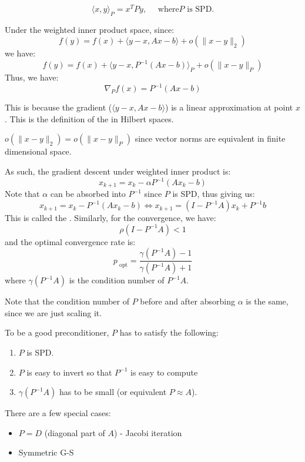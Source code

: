 \documentclass[../main/main.tex]{subfiles}
\begin{document}
\begin{definition}
  \[
    \langle x,y\rangle_{P} = x^{T} P y, \quad  \text{ where} P \text{ is SPD}.
  \]
\end{definition}
Under the weighted inner product space, since: \[
  f(y) = f(x) + \langle y-x, Ax-b \rangle + o(\|x-y\|_{2})
\]
we have: \[
  f(y) = f(x) + \langle y-x,P^{-1}(Ax-b) \rangle_{P} + o(\|x-y\|_{P})
\]
Thus, we have: \[
\nabla_{P}f(x)= P^{-1}(Ax-b)
\]
\begin{remark}
This is because the gradient ($\langle y-x, Ax-b \rangle $) is a linear approximation at point $x$. This is the definition of the  in Hilbert spaces.
\end{remark}
\begin{remark}
$o(\|x-y\|_{2})=o(\|x-y\|_{P})$ since vector norms are equivalent in finite dimensional space.
\end{remark}
As such, the gradient descent under weighted inner product is: \[
x_{k+1} = x_{k} - \alpha P^{-1}(Ax_{k}-b)
\]Note that $\alpha $ can be absorbed into $P^{-1}$ since $P$ is SPD, thus giving us: \[
x_{k+1} = x_{k} - P^{-1}(Ax_{k}-b) \iff  x_{k+1} = (I-P^{-1} A) x_{k} + P^{-1} b
\] This is called the . Similarly, for the convergence, we have: \[
  \rho (I-P^{-1} A) < 1
\] and the optimal convergence rate is: \[
  p_{\text{ opt}} = \frac{\gamma (P^{-1} A)-1}{\gamma (P^{-1} A)+1}
\]where $\gamma (P^{-1} A)$ is the condition number of $P^{-1} A$.
\begin{remark}
Note that the condition number of $P$ before and after absorbing $\alpha $ is the same, since we are just scaling it.
\end{remark}
To be a good preconditioner, $P$ has to satisfy the following:
\begin{enumerate}
  \item $P$ is SPD.
  \item $P$ is easy to invert so that $P^{-1}$ is easy to compute
        \item $\gamma (P^{-1} A)$ has to be small (or equivalent $P \approx A$).
\end{enumerate}
There are a few special cases:
\begin{itemize}
  \item $P=D$ (diagonal part of $A$) - Jacobi iteration
\item Symmetric G-S
\end{itemize}
\end{document}
